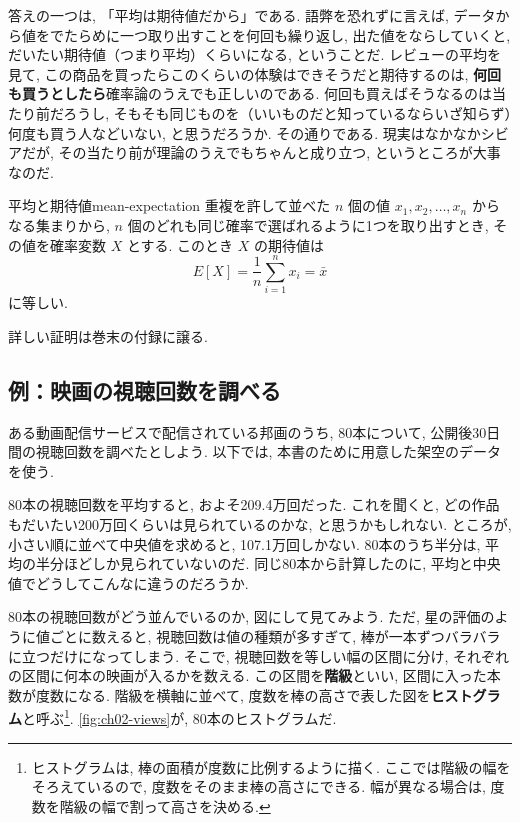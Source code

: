     答えの一つは, 「平均は期待値だから」である.
    語弊を恐れずに言えば, データから値をでたらめに一つ取り出すことを何回も繰り返し, 出た値をならしていくと, だいたい期待値（つまり平均）くらいになる, ということだ.
    レビューの平均を見て, この商品を買ったらこのくらいの体験はできそうだと期待するのは, \textbf{何回も買うとしたら}確率論のうえでも正しいのである.
    何回も買えばそうなるのは当たり前だろうし, そもそも同じものを（いいものだと知っているならいざ知らず）何度も買う人などいない, と思うだろうか.
    その通りである.
    現実はなかなかシビアだが, その当たり前が理論のうえでもちゃんと成り立つ, というところが大事なのだ.

    \begin{prop}{平均と期待値}{mean-expectation}
      重複を許して並べた $n$ 個の値 $x_1, x_2, \ldots, x_n$ からなる集まりから, $n$ 個のどれも同じ確率で選ばれるように1つを取り出すとき, その値を確率変数 $X$ とする.
      このとき $X$ の期待値は
      \[
        E[X] = \frac{1}{n} \sum_{i=1}^{n} x_i = \bar{x}
      \]
      に等しい.
    \end{prop}

    詳しい証明は巻末の付録に譲る.

  \subsection{例：映画の視聴回数を調べる}

    ある動画配信サービスで配信されている邦画のうち, 80本について,
    公開後30日間の視聴回数を調べたとしよう.
    以下では, 本書のために用意した架空のデータを使う.

    80本の視聴回数を平均すると, およそ209.4万回だった.
    これを聞くと, どの作品もだいたい200万回くらいは見られているのかな, と思うかもしれない.
    ところが, 小さい順に並べて中央値を求めると, 107.1万回しかない.
    80本のうち半分は, 平均の半分ほどしか見られていないのだ.
    同じ80本から計算したのに, 平均と中央値でどうしてこんなに違うのだろうか.

    80本の視聴回数がどう並んでいるのか, 図にして見てみよう.
    ただ, 星の評価のように値ごとに数えると, 視聴回数は値の種類が多すぎて, 棒が一本ずつバラバラに立つだけになってしまう.
    そこで, 視聴回数を等しい幅の区間に分け, それぞれの区間に何本の映画が入るかを数える.
    この区間を\textbf{階級}といい, 区間に入った本数が度数になる.
    階級を横軸に並べて, 度数を棒の高さで表した図を\textbf{ヒストグラム}と呼ぶ\footnote{%
    ヒストグラムは, 棒の面積が度数に比例するように描く.
    ここでは階級の幅をそろえているので, 度数をそのまま棒の高さにできる.
    幅が異なる場合は, 度数を階級の幅で割って高さを決める.}.
    \cref{fig:ch02-views}が, 80本のヒストグラムだ.

